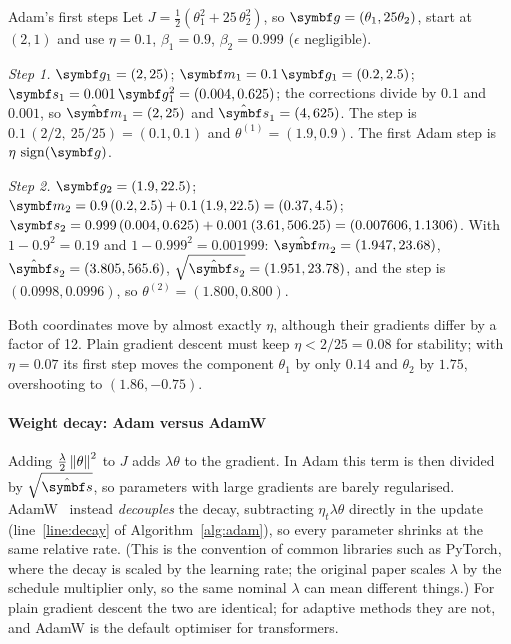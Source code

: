 \documentclass[11pt]{article}
\newcommand{\gvec}{\vect{g}}
\newcommand{\mvec}{\vect{m}}
\begin{document}
\begin{worked}{Adam's first steps}
Let $J = \frac12(\theta_1^2 + 25\,\theta_2^2)$, so $\gvec = (\theta_1, 25\theta_2)$, start at $(2, 1)$ and use
$\eta = 0.1$, $\beta_1 = 0.9$, $\beta_2 = 0.999$ ($\epsilon$ negligible).

\emph{Step 1.} $\gvec_1 = (2, 25)$; $\mvec_1 = 0.1\,\gvec_1 = (0.2, 2.5)$; $\vect{s}_1 = 0.001\,\gvec_1^2 = (0.004, 0.625)$;
the corrections divide by $0.1$ and $0.001$, so $\hat{\mvec}_1 = (2, 25)$ and $\hat{\vect{s}}_1 = (4, 625)$. The step is
$0.1\,(2/2,\ 25/25) = (0.1, 0.1)$ and $\theta^{(1)} = (1.9, 0.9)$. The first Adam step is $\eta\,\operatorname{sign}(\gvec)$.

\emph{Step 2.} $\gvec_2 = (1.9, 22.5)$; $\mvec_2 = 0.9\,(0.2, 2.5) + 0.1\,(1.9, 22.5) = (0.37, 4.5)$;
$\vect{s}_2 = 0.999\,(0.004, 0.625) + 0.001\,(3.61, 506.25) = (0.007606, 1.1306)$. With $1 - 0.9^2 = 0.19$ and
$1 - 0.999^2 = 0.001999$: $\hat{\mvec}_2 = (1.947, 23.68)$, $\hat{\vect{s}}_2 = (3.805, 565.6)$,
$\sqrt{\hat{\vect{s}}_2} = (1.951, 23.78)$, and the step is $(0.0998, 0.0996)$, so $\theta^{(2)} = (1.800, 0.800)$.

Both coordinates move by almost exactly $\eta$, although their gradients differ by a factor of 12. Plain gradient
descent must keep $\eta < 2/25 = 0.08$ for stability; with $\eta = 0.07$ its first step moves the component $\theta_1$ by only $0.14$
and $\theta_2$ by $1.75$, overshooting to $(1.86, -0.75)$.
\end{worked}

\paragraph{Weight decay: Adam versus AdamW} Adding $\frac\lambda2\left\lVert \theta \right\rVert^2$ to $J$ adds $\lambda\theta$ to the
gradient. In Adam this term is then divided by $\sqrt{\hat{\vect{s}}}$, so parameters with large gradients are barely
regularised. AdamW~\cite{loshchilov2019} instead \emph{decouples} the decay, subtracting $\eta_t\lambda\theta$ directly
in the update (line~\ref{line:decay} of Algorithm~\ref{alg:adam}), so every parameter shrinks at the same relative rate.
(This is the convention of common libraries such as PyTorch, where the decay is scaled by the learning rate; the original
paper scales $\lambda$ by the schedule multiplier only, so the same nominal $\lambda$ can mean different things.)
For plain gradient descent the two are identical; for adaptive methods they are not, and AdamW is the default
optimiser for transformers.
\end{document}
